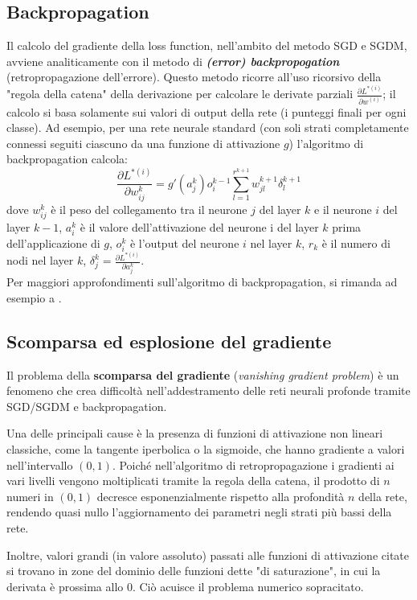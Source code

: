\subsection{Backpropagation}
\label{backpropagation}
Il calcolo del gradiente della loss function, nell'ambito del metodo SGD e SGDM, avviene analiticamente con il metodo di \textbf{\textit{(error) backpropogation}} (retropropagazione dell'errore). Questo metodo ricorre all'uso ricorsivo della "regola della catena" della derivazione per calcolare le derivate parziali $\frac{\partial L^{*(i)}}{\partial w^{(i)}}$; il calcolo si basa solamente sui valori di output della rete (i punteggi finali per ogni classe). Ad esempio, per una rete neurale standard (con soli strati completamente connessi seguiti ciascuno da una funzione di attivazione $g$) l'algoritmo di backpropagation calcola:
\[
\frac{\partial L^{*(i)}}{\partial w_{ij}^k}=g'(a_j^k)o_i^{k-1}\sum_{l=1}^{r^{k+1}}w_{jl}^{k+1}\delta_l^{k+1}
\]
dove $w_{ij}^k$ è il peso del collegamento tra il neurone $j$ del layer $k$ e il neurone $i$ del layer $k-1$, $a_i^k$ è il valore dell'attivazione del neurone i del layer $k$ prima dell'applicazione di $g$, $o_i^k$ è l'output del neurone $i$ nel layer $k$, $r_k$ è il numero di nodi nel layer $k$, $\delta_j^k=\frac{\partial L^{*(i)}}{\partial a_j^k}$.\\

Per maggiori approfondimenti sull'algoritmo di backpropagation, si rimanda ad esempio a \cite{dlbook}.

\subsection{Scomparsa ed esplosione del gradiente}
\label{vanishingGradient}
Il problema della \textbf{scomparsa del gradiente} (\textit{vanishing gradient problem}) è un fenomeno che crea difficoltà nell'addestramento delle reti neurali profonde tramite SGD/SGDM e backpropagation.

Una delle principali cause è la presenza di funzioni di attivazione non lineari classiche, come la tangente iperbolica o la sigmoide, che hanno gradiente a valori nell'intervallo $(0,1)$.
Poiché nell'algoritmo di retropropagazione i gradienti ai vari livelli vengono moltiplicati tramite la regola della catena, il prodotto di $n$ numeri in $(0,1)$ decresce esponenzialmente rispetto alla profondità $n$ della rete, rendendo quasi nullo l'aggiornamento dei parametri negli strati più bassi della rete.

Inoltre, valori grandi (in valore assoluto) passati alle funzioni di attivazione citate si trovano in zone del dominio delle funzioni dette "di saturazione", in cui la derivata è prossima allo 0. Ciò acuisce il problema numerico sopracitato.\\

